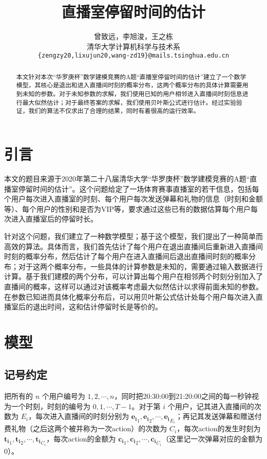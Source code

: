\documentclass{article} %
\title{直播室停留时间的估计}
\author{曾致远，李旭浚，王之栋 \\
清华大学计算机科学与技术系\\
\texttt{\{zengzy20,lixujun20,wang-zd19\}@mails.tsinghua.edu.cn}
}
\begin{document}
\maketitle

\begin{abstract}
本文针对本次“华罗庚杯”数学建模竞赛的A题“直播室停留时间的估计”建立了一个数学模型，其核心是退出和进入直播间时刻的概率分布，这两个概率分布的具体计算需要用到未知的参数。对于未知参数的求解，我们使用已知的用户相邻进入直播间时刻信息进行最大似然估计；对于最终答案的求解，我们使用贝叶斯公式进行估计。经过实验验证，我们的算法不仅求出了合理的结果，同时有着很高的运行效率。
\end{abstract}

\section{引言}

本文的题目来源于2020年第二十八届清华大学“华罗庚杯”数学建模竞赛的A题“直播室停留时间的估计”。这个问题给定了一场体育赛事直播室的若干信息，包括每个用户每次进入直播室的时刻、每个用户每次发送弹幕和礼物的信息（时刻和金额等）、每个用户的性别和是否为VIP等，要求通过这些已有的数据估算每个用户每次进入直播室后的停留时长。

针对这个问题，我们建立了一种数学模型；基于这个模型，我们提出了一种简单而高效的算法。具体而言，我们首先估计了每个用户在退出直播间后重新进入直播间时刻的概率分布，然后估计了每个用户在进入直播间后退出直播间时刻的概率分布；对于这两个概率分布，一些具体的计算参数是未知的，需要通过输入数据进行计算。基于我们建模的两个分布，可以计算出每个用户在相邻两个时刻分别加入了直播间的概率，这样可以通过对该概率考虑最大似然估计以求得前面未知的参数。在参数已知进而具体化概率分布后，可以用贝叶斯公式估计处每个用户每次进入直播室后的退出时间，这和估计停留时长是等价的。

\section{模型}

\subsection{记号约定}

把所有的 $n$ 个用户编号为 $1,2,\cdots,n$，同时把20:30:00到21:20:00之间的每一秒钟视为一个时刻，时刻的编号为 $0,1,\cdots,T-1$。对于第 $i$ 个用户，记其进入直播间的次数为 $E_i$，每次进入直播间的时刻分别为 $\mathbf{e_i}_1,\mathbf{e_i}_2,\cdots,\mathbf{e_i}_{E_i}$；再记其发送弹幕和赠送付费礼物（之后这两个被并称为一次action）的次数为 $C_i$，每次action的发生时刻为 $\mathbf{t_i}_1,\mathbf{t_i}_2,\cdots,\mathbf{t_i}_{C_i}$，每次action的金额为 $\mathbf{c_i}_1,\mathbf{c_i}_2,\cdots,\mathbf{c_i}_{C_i}$（这里记一次弹幕对应的金额为 $0$）。
\end{document}
